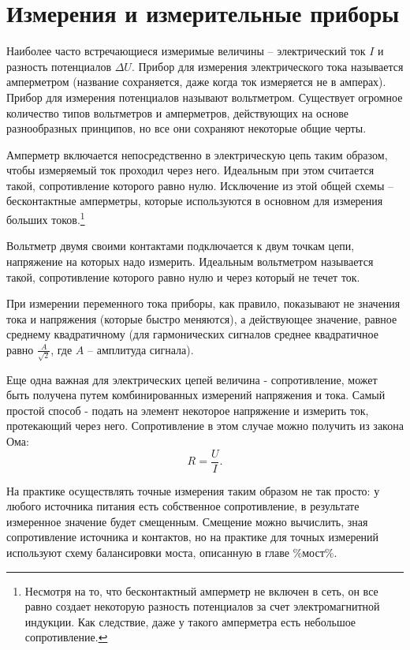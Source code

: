 \section{Измерения и измерительные приборы}

Наиболее часто встречающиеся измеримые величины -- электрический ток $I$ и разность потенциалов $\Delta U$. Прибор для измерения электрического тока называется амперметром (название сохраняется, даже когда ток измеряется не в амперах). Прибор для измерения потенциалов называют вольтметром. Существует огромное количество типов вольтметров и амперметров, действующих на основе разнообразных принципов, но все они сохраняют некоторые общие черты.

Амперметр включается непосредственно в электрическую цепь таким образом, чтобы измеряемый ток проходил через него. Идеальным при этом считается такой, сопротивление которого равно нулю. Исключение из этой общей схемы -- бесконтактные амперметры, которые используются в основном для измерения больших токов.\footnote{Несмотря на то, что бесконтактный амперметр не включен в сеть, он все равно создает некоторую разность потенциалов за счет электромагнитной индукции. Как следствие, даже у такого амперметра есть небольшое сопротивление.} 

Вольтметр двумя своими контактами подключается к двум точкам цепи, напряжение на которых надо измерить. Идеальным вольтметром называется такой, сопротивление которого равно нулю и через который не течет ток.

При измерении переменного тока приборы, как правило, показывают не значения тока и напряжения (которые быстро меняются), а действующее значение, равное среднему квадратичному (для гармонических сигналов среднее квадратичное равно $\frac{A}{\sqrt{2}}$, где $A$ -- амплитуда сигнала).

Еще одна важная для электрических цепей величина - сопротивление, может быть получена путем комбинированных измерений напряжения и тока. Самый простой способ - подать на элемент некоторое напряжение и измерить ток, протекающий через него. Сопротивление в этом случае можно получить из закона Ома:
\begin{equation}
	R = \frac{U}{I}.
\end{equation}

На практике осуществлять точные измерения таким образом не так просто: у любого источника питания есть собственное сопротивление, в результате измеренное значение будет смещенным. Смещение можно вычислить, зная сопротивление источника и контактов, но на практике для точных измерений используют схему балансировки моста, описанную в главе \%мост\%.

